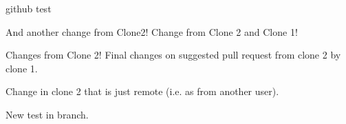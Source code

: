 \documentclass[10pt,a4paper]{report}
\begin{document}
github test

And another change from Clone2!
Change from Clone 2 and Clone 1!

Changes from Clone 2!
Final changes on suggested pull request from clone 2 by clone 1.




Change in clone 2 that is just remote (i.e. as from another user).

New test in branch.
\end{document}
